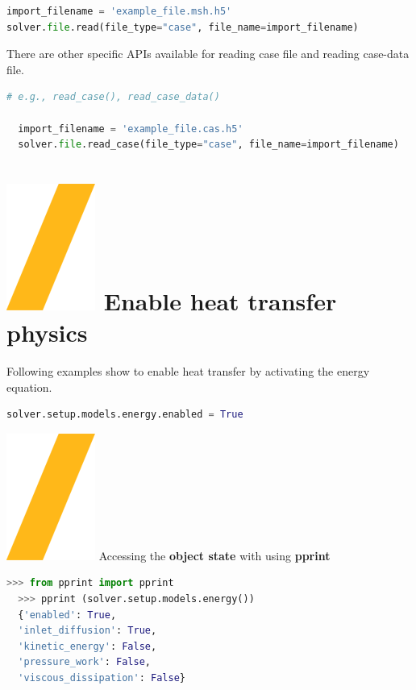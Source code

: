 \documentclass[9pt,landscape]{article}
\begin{document}
\begin{multicols}{3}
\begin{lstlisting}[language=Python]
import_filename = 'example_file.msh.h5'
solver.file.read(file_type="case", file_name=import_filename)
\end{lstlisting}

There are other specific APIs available for reading case file and
reading case-data file. 

\begin{lstlisting}[language=Python]
  # e.g., read_case(), read_case_data()

  import_filename = 'example_file.cas.h5'
  solver.file.read_case(file_type="case", file_name=import_filename)  
\end{lstlisting}


\section{\includegraphics[height=\fontcharht\font`\S]{slash.png} Enable heat transfer physics}

Following examples show to enable heat transfer by activating the energy equation.

\begin{lstlisting}[language=Python]
solver.setup.models.energy.enabled = True
\end{lstlisting}

{\includegraphics[height=\fontcharht\font`\S]{slash.png} Accessing the \textbf{object state} with using \textbf{pprint}

\begin{lstlisting}[language=Python]
  >>> from pprint import pprint
  >>> pprint (solver.setup.models.energy())
  {'enabled': True,
  'inlet_diffusion': True,
  'kinetic_energy': False,
  'pressure_work': False,
  'viscous_dissipation': False}  
\end{lstlisting}


}
\end{multicols}
\end{document}
